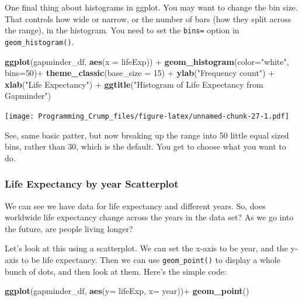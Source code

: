 \documentclass[]{book}
\newenvironment{Shaded}{\begin{snugshade}}{\end{snugshade}}
\newcommand{\KeywordTok}[1]{\textcolor[rgb]{0.13,0.29,0.53}{\textbf{{#1}}}}
\newcommand{\DataTypeTok}[1]{\textcolor[rgb]{0.13,0.29,0.53}{{#1}}}
\newcommand{\DecValTok}[1]{\textcolor[rgb]{0.00,0.00,0.81}{{#1}}}
\newcommand{\StringTok}[1]{\textcolor[rgb]{0.31,0.60,0.02}{{#1}}}
\newcommand{\NormalTok}[1]{{#1}}
\theoremstyle{definition}
\theoremstyle{definition}
\theoremstyle{definition}
\theoremstyle{remark}
\begin{document}
One final thing about histograms in ggplot. You may want to change the
bin size. That controls how wide or narrow, or the number of bars (how
they split across the range), in the histogram. You need to set the
\texttt{bins=} option in \texttt{geom\_histogram()}.

\begin{Shaded}
\begin{Highlighting}[]
\KeywordTok{ggplot}\NormalTok{(gapminder_df, }\KeywordTok{aes}\NormalTok{(}\DataTypeTok{x =} \NormalTok{lifeExp)) +}
\StringTok{  }\KeywordTok{geom_histogram}\NormalTok{(}\DataTypeTok{color=}\StringTok{"white"}\NormalTok{, }\DataTypeTok{bins=}\DecValTok{50}\NormalTok{)+}\StringTok{ }
\StringTok{  }\KeywordTok{theme_classic}\NormalTok{(}\DataTypeTok{base_size =} \DecValTok{15}\NormalTok{) +}
\StringTok{  }\KeywordTok{ylab}\NormalTok{(}\StringTok{"Frequency count"}\NormalTok{) +}\StringTok{ }
\StringTok{  }\KeywordTok{xlab}\NormalTok{(}\StringTok{"Life Expectancy"}\NormalTok{) +}
\StringTok{  }\KeywordTok{ggtitle}\NormalTok{(}\StringTok{"Histogram of Life Expectancy from Gapminder"}\NormalTok{)}
\end{Highlighting}
\end{Shaded}

\texttt{[image: Programming\_Crump\_files/figure-latex/unnamed-chunk-27-1.pdf]}

See, same basic patter, but now breaking up the range into 50 little
equal sized bins, rather than 30, which is the default. You get to
choose what you want to do.

\subsubsection{Life Expectancy by year
Scatterplot}\label{life-expectancy-by-year-scatterplot}

We can see we have data for life expectancy and different years. So,
does worldwide life expectancy change across the years in the data set?
As we go into the future, are people living longer?

Let's look at this using a scatterplot. We can set the x-axis to be
year, and the y-axis to be life expectancy. Then we can use
\texttt{geom\_point()} to display a whole bunch of dots, and then look
at them. Here's the simple code:

\begin{Shaded}
\begin{Highlighting}[]
\KeywordTok{ggplot}\NormalTok{(gapminder_df, }\KeywordTok{aes}\NormalTok{(}\DataTypeTok{y=} \NormalTok{lifeExp, }\DataTypeTok{x=} \NormalTok{year))+}
\StringTok{  }\KeywordTok{geom_point}\NormalTok{()}
\end{Highlighting}
\end{Shaded}
\end{document}
